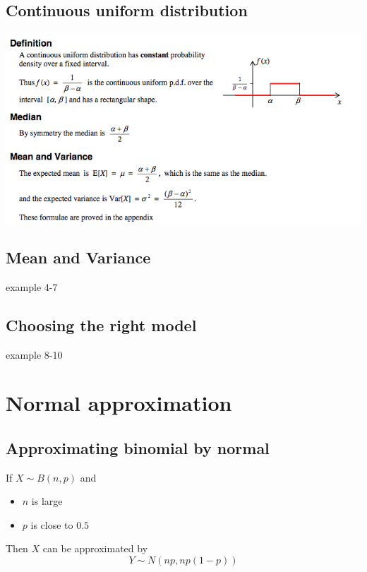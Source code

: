 \documentclass[a4paper]{article}
\begin{document}
\subsection{Continuous uniform distribution}
\begin{center}
	\includegraphics[scale=0.5]{img_S/12_intro}
\end{center}
\subsection{Mean and Variance}

\begin{eg}
	example 4-7

\end{eg}

\subsection{Choosing the right model}

\begin{eg}
	example 8-10
\end{eg}

\section{Normal approximation}
\subsection{Approximating binomial by normal}
If $X\sim B(n,p)$ and
\begin{itemize}
	\item $n$ is large
	\item $p$ is close to $0.5$
\end{itemize}
Then $X$ can be approximated by
\[
	Y\sim N(np,np(1-p))
\]
\end{document}
